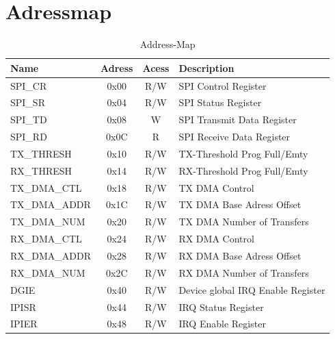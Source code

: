 \section{Adressmap}
\begin{table} [!h]
	\centering
		\begin{tabular}{|l|c|c|l|} \hline
		\textbf{Name}		& \textbf{Adress}	& \textbf{Acess}	& \textbf{Description} 				\\ \hline
		SPI\_CR					& 0x00						& R/W							& SPI Control Register				\\ \hline
		SPI\_SR					& 0x04						& R/W							& SPI  Status Register				\\ \hline
		SPI\_TD					& 0x08						& W								& SPI Transmit Data  Register \\ \hline
		SPI\_RD					& 0x0C						& R								& SPI Receive Data  Register 	\\ \hline		
		TX\_THRESH	  	& 0x10						& R/W							& TX-Threshold Prog Full/Emty	\\ \hline
		RX\_THRESH		  & 0x14						& R/W							& RX-Threshold Prog Full/Emty \\ \hline		
		TX\_DMA\_CTL		& 0x18						& R/W							& TX DMA Control							\\ \hline
		TX\_DMA\_ADDR		& 0x1C						& R/W							& TX DMA Base Adress Offset		\\ \hline	
		TX\_DMA\_NUM		& 0x20						& R/W							& TX DMA Number of Transfers	\\ \hline	
		RX\_DMA\_CTL		& 0x24						& R/W							& RX DMA Control							\\ \hline
		RX\_DMA\_ADDR		& 0x28						& R/W							& RX DMA Base Adress Offset		\\ \hline	
		RX\_DMA\_NUM		& 0x2C						& R/W							& RX DMA Number of Transfers	\\ \hline	
							
		DGIE	  				& 0x40						& R/W							& Device global IRQ Enable Register	\\ \hline	
		IPISR	   				& 0x44						& R/W							& IRQ Status Register	  			\\ \hline	
		IPIER	   				& 0x48						& R/W							& IRQ Enable Register	  			\\ \hline			
		\end{tabular}
	\caption{Address-Map}
	\label{tab:registers}
\end{table}

